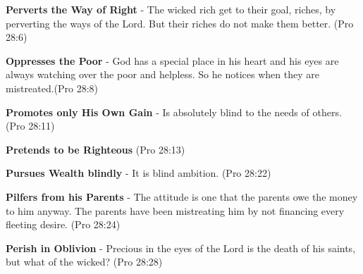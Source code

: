 \begin{compactenum}[I.]
    \item \textbf{Perverts the Way of Right} - The wicked rich get to their goal, riches, by perverting the ways of the Lord. But their riches do not make them better. (Pro 28:6)
    \item \textbf{Oppresses the Poor} - God has a special place in his heart and his eyes are always watching over the poor and helpless.  So he notices when they are mistreated.(Pro 28:8) 
    \item \textbf{Promotes only His Own Gain} - Is absolutely blind to the needs of others. (Pro 28:11) 
    \item \textbf{Pretends to be Righteous}  (Pro 28:13) 
    \item \textbf{Pursues Wealth blindly} - It is blind ambition. (Pro 28:22)
    \item \textbf{Pilfers from his Parents} - The attitude is one that the parents owe the money to him anyway.  The parents have been mistreating him by not financing every fleeting desire. (Pro 28:24)
    \item \textbf{Perish in Oblivion} - Precious in the eyes of the Lord is the death of his saints, but what of the wicked? (Pro 28:28)
\end{compactenum}

